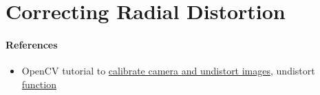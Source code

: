 
\section{Correcting Radial Distortion}

\paragraph{References}
\begin{itemize}
    \item OpenCV tutorial to \href{https://docs.opencv.org/4.x/dc/dbb/tutorial_py_calibration.html}{calibrate camera and undistort images}, undistort \href{https://docs.opencv.org/4.x/d9/d0c/group__calib3d.html#ga69f2545a8b62a6b0fc2ee060dc30559d}{function}
\end{itemize}
